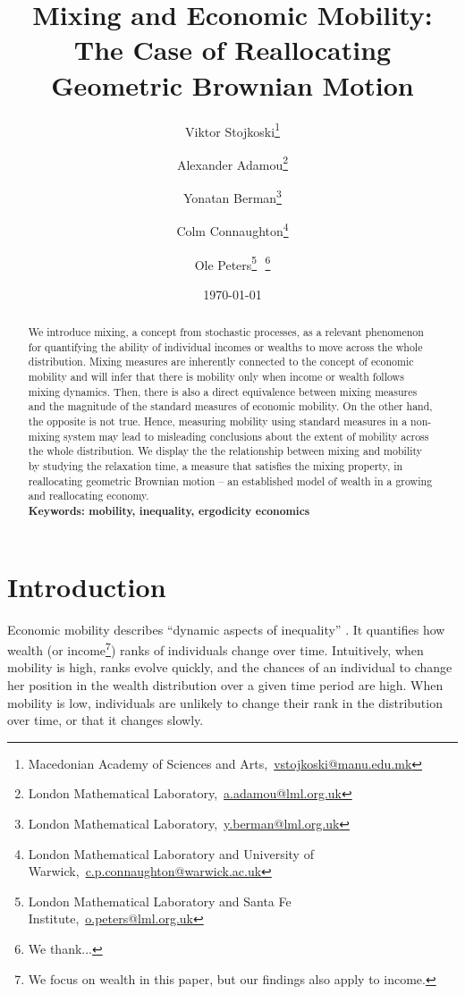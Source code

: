 \documentclass[11pt]{article}
\newcommand{\bc}{\begin{center}}
\newcommand{\ec}{\end{center}}
\newcommand{\red}[1]{{\color{red} #1}}
\numberwithin{equation}{section}
\begin{document}
\begin{titlepage}
\title{Mixing and Economic Mobility: The Case of Reallocating Geometric Brownian Motion}
\author{Viktor Stojkoski\footnote{Macedonian Academy of Sciences and Arts,~\url{vstojkoski@manu.edu.mk}} \and Alexander Adamou\footnote{London Mathematical Laboratory,~\url{a.adamou@lml.org.uk}} \and Yonatan Berman\footnote{London Mathematical Laboratory,~\url{y.berman@lml.org.uk}} \and Colm Connaughton\footnote{London Mathematical Laboratory and University of Warwick,~\url{c.p.connaughton@warwick.ac.uk}} \and Ole Peters\footnote{London Mathematical Laboratory and Santa Fe Institute,~\url{o.peters@lml.org.uk}}\,\, \thanks{We thank...}}
\date{\today}
\maketitle
\begin{abstract}
We introduce mixing, a concept from stochastic processes, as a relevant phenomenon for quantifying the ability of individual incomes or wealths to move across the whole distribution. Mixing measures are inherently connected to the concept of economic mobility and will  infer that there is mobility only when income or wealth follows mixing dynamics. Then, there is also a direct equivalence between mixing measures and the magnitude of the standard measures of economic mobility. On the other hand, the opposite is not true. Hence, measuring mobility using standard measures in a non-mixing system may lead to misleading conclusions about the extent of mobility across the whole distribution. We display the the relationship between mixing and mobility by studying the relaxation time, a measure that satisfies the mixing property, in reallocating geometric Brownian motion -- an established model of wealth in a growing and reallocating economy.
\\

\noindent\textbf{Keywords: mobility, inequality, ergodicity economics}
\end{abstract}
\setcounter{page}{0}
\thispagestyle{empty}
\end{titlepage}
\pagebreak \newpage
\section{Introduction}\label{sec:introduction}
Economic mobility describes ``dynamic aspects of inequality'' \citep{Shorrocks1978}. It quantifies how wealth (or income\footnote{We focus on wealth in this paper, but our findings also apply to income.}) ranks of individuals change over time. Intuitively, when mobility is high, ranks evolve quickly, and the chances of an individual to change her position in the wealth distribution over a given time period are high. When mobility is low, individuals are unlikely to change their rank in the distribution over time, or that it changes slowly.
\end{document}
